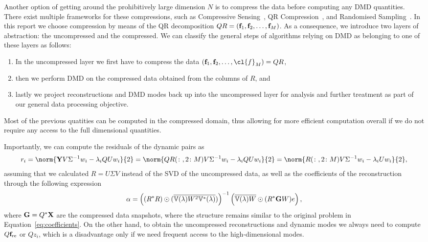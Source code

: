 Another option of getting around the prohibitively large dimension $N$ is to compress the data before computing any DMD quantities. There exist multiple frameworks for these compressions, such as Compressive Sensing~\cite{Brunton2016a}, QR Compression~\cite{Drmac2020VandermondeKhatriRao}, and Randomised Sampling~\cite{Erichson2019}. In this report we choose compression by means of the QR decomposition $Q R = (\mathbf{f}_1, \mathbf{f}_2, \dots, \mathbf{f}_M)$. As a consequence, we introduce two layers of abstraction: the uncompressed and the compressed. We can classify the general steps of algorithms relying on DMD as belonging to one of these layers as follows:
\begin{enumerate}
    \item In the uncompressed layer we first have to compress the data $(\bl{f}_1, \bl{f}_2, \dots, \cl{f}_M) = Q R$,
    \item then we perform DMD on the compressed data obtained from the columns of $R$, and
    \item lastly we project reconstructions and DMD modes back up into the uncompressed layer for analysis and further treatment as part of our general data processing objective.
\end{enumerate}
Most of the previous quatities can be computed in the compressed domain, thus allowing for more efficient computation overall if we do not require any access to the full dimensional quantities.

Importantly, we can compute the residuals of the dynamic pairs as
\begin{equation*}
    r_i = \norm{\bl{Y} V \Sigma^{-1} w_i - \lambda_i Q U w_i}{2} = \norm{Q R(\colon, 2 \colon M) V \Sigma^{-1} w_i - \lambda_i Q U w_i}{2} = \norm{R(\colon, 2 \colon M) V \Sigma^{-1} w_i - \lambda_i U w_i}{2},
\end{equation*}
assuming that we calculated $R = U \Sigma V$ instead of the SVD of the uncompressed data, as well as the coefficients of the reconstruction through the following expression
\begin{equation*}
    \alpha = {\left( (R^* R) \odot (\overline{\mathbb{V}(\lambda) W^2 \mathbb{V}^*(\lambda)}) \right)}^{-1} \left( \overline{\mathbb{V}(\lambda) W} \odot (R^* \mathbf{G} W) e \right),
\end{equation*}
where $\mathbf{G} = Q^* \mathbf{X}$ are the compressed  data snapshots, where the structure remains similar to the original problem in Equation~\eqref{eq:coefficients}. On the other hand, to obtain the uncompressed reconstructions and dynamic modes we always need to compute $Q \mathbf{f}_\text{re}$ or $Q z_i$, which is a disadvantage only if we need frequent access to the high-dimensional modes.

